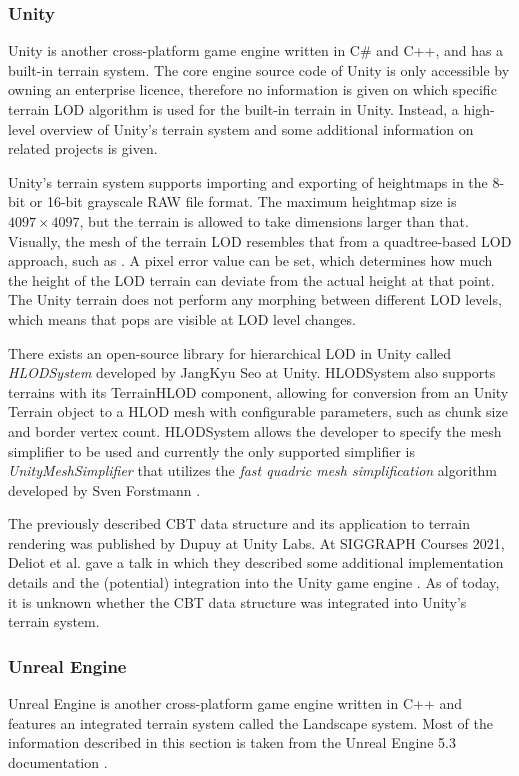 \subsubsection{Unity}
Unity is another cross-platform game engine written in C\# and C++, and has a 
built-in terrain system. 
The core engine source code of Unity is only accessible
by owning an enterprise licence, therefore no information is given on which 
specific terrain LOD algorithm is used for the built-in terrain in Unity.
Instead, a high-level overview of Unity's terrain system
and some additional information on related projects is given.

Unity's terrain system supports importing and exporting of heightmaps in 
the 8-bit or 16-bit grayscale RAW file format. The maximum 
heightmap size is $4097 \times 4097$, but the terrain 
is allowed to take dimensions larger than that.
Visually, the mesh of the terrain LOD resembles that from a quadtree-based LOD approach, such as \cite{chunkedlod}.
A pixel error value can be set, which determines how much 
the height of the LOD terrain can deviate from the actual height at that point.
The Unity terrain does not perform any morphing between different LOD levels,
which means that pops are visible at LOD level changes.

There exists an open-source library for hierarchical LOD in Unity called \textit{HLODSystem} \cite{unityhlod} developed by JangKyu Seo at Unity.
HLODSystem also supports terrains with its TerrainHLOD component, allowing for conversion from an Unity Terrain object to a HLOD mesh with configurable parameters, such as chunk size and border vertex count.
HLODSystem allows the developer to specify the mesh simplifier to be used and currently the only supported simplifier is \textit{UnityMeshSimplifier} \cite{unitymeshsimplifier} that utilizes the \textit{fast quadric mesh simplification} algorithm developed by Sven Forstmann \cite{fastquadric}.

The previously described CBT data structure and its application to terrain rendering was published by Dupuy 
at Unity Labs. 
At SIGGRAPH Courses 2021, Deliot et al. gave a talk in which they described some additional implementation details 
and the (potential) integration into the Unity game engine \cite{cbtcourses}. As of today, it is unknown 
whether the CBT data structure was integrated into Unity's terrain system.

\subsubsection{Unreal Engine}
Unreal Engine is another cross-platform game engine written in C++ and features
an integrated terrain system called the Landscape system.
Most of the information described in this section is taken from the 
Unreal Engine 5.3 documentation \cite{unrealengine5doc}.


